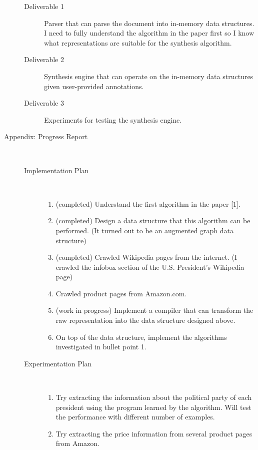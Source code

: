 \documentclass[12pt,a4paper]{article}
\begin{document}
\begin{description}
\begin{description}
        \item[Deliverable 1] Parser that can parse the document into in-memory data structures. I need to fully understand the algorithm in the paper first so I know what representations are suitable for the synthesis algorithm.
        
        \item[Deliverable 2] Synthesis engine that can operate on the in-memory data structures given user-provided annotations.

        \item[Deliverable 3] Experiments for testing the synthesis engine.
    \end{description}

\item[Appendix: Progress Report]\text{}\\


	\begin{description}
		\item[Implementation Plan]\text{}\\
		\begin{enumerate}
			\item (completed) Understand the first algorithm in the paper [1].
			\item (completed) Design a data structure that this algorithm can be performed. (It turned out to be an augmented graph data structure)
			\item (completed) Crawled Wikipedia pages from the internet. (I crawled the infobox section of the U.S. President's Wikipedia page) 
			\item Crawled product pages from Amazon.com.
			\item (work in progress) Implement a compiler that can transform the raw representation into the data structure designed above.
			\item On top of the data structure, implement the algorithms investigated in bullet point 1. 
		\end{enumerate}
	\item[Experimentation Plan]\text{}\\
	\begin{enumerate}
		\item Try extracting the information about the political party of each president using the program learned by the algorithm. Will test the performance with different number of examples.
		\item Try extracting the price information from several product pages from Amazon.
	\end{enumerate}
	\end{description}
\end{description}
\nocite{Le2014FlashExtractAF} 
\nocite{yaghmazadeh2018automated}


\end{document}
